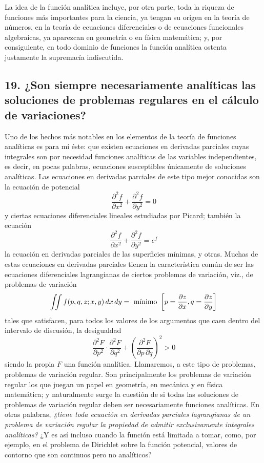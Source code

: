 \documentclass[a4paper, 12pt]{article}
\begin{document}
La idea de la función analítica incluye, por otra parte, toda la riqueza de funciones más importantes para la ciencia, ya tengan su origen en la teoría de números, en la teoría de ecuaciones diferenciales o de ecuaciones funcionales algebraicas, ya aparezcan en geometría o en física matemática; y, por consiguiente, en todo  dominio de funciones la función analítica ostenta justamente la supremacía indiscutida.


{\subsection*{19. ¿Son siempre necesariamente analíticas las soluciones
de problemas regulares en el cálculo de variaciones?}


Uno de los hechos más notables en los elementos de la teoría de funciones analíticas es para mí éste: que existen ecuaciones en derivadas parciales cuyas integrales son por necesidad funciones analíticas de las variables independientes, es decir, en pocas palabras, ecuaciones susceptibles únicamente de soluciones analíticas. Las ecuaciones en derivadas parciales de este tipo mejor conocidas son la ecuación de potencial
$$
\frac{\partial^2 f}{\partial x^2}+ \frac{\partial^2 f}{\partial y^2}=0
$$
y ciertas ecuaciones diferenciales lineales estudiadas por Picard; también la ecuación
$$
\frac{\partial^2 f}{\partial x^2}+ \frac{\partial^2 f}{\partial y^2}=e^f
$$
la ecuación en derivadas parciales de las superficies mínimas, y otras. Muchas de estas ecuaciones en derivadas parciales tienen la característica común de ser las ecuaciones diferenciales lagrangianas de ciertos problemas de variación, viz., de problemas de variación
$$
\iint f(p,q,z;x,y) \, dx \, dy = \text{ mínimo }\\
\left[
p=\frac{\partial z}{\partial x}, q = \frac{\partial z}{\partial y} \right]
$$
tales que satisfacen, para todos los valores de los argumentos que caen dentro del intervalo de discusión, la desigualdad
$$
\frac{\partial^2 F}{\partial p^2} \cdot \frac{\partial^2 F}{\partial q^2} + \left(\frac{\partial^2 F}{\partial p \, \partial q}\right)^2 >0
$$
siendo la propia $F$ una función analítica. Llamaremos, a este tipo de problemas, problemas de variación regular. Son principalmente los problemas de variación regular los que juegan un papel en geometría, en mecánica y en física matemática; y naturalmente surge la cuestión de si todas las soluciones de problemas de variación regular deben ser necesariamente funciones analíticas. En otras palabras, \textit{¿tiene toda ecuación en derivadas parciales lagrangianas de un problema de variación regular la propiedad de admitir exclusivamente integrales analíticas?} ¿Y es así incluso cuando la función está limitada a tomar, como, por ejemplo, en el problema de Dirichlet sobre la función potencial, valores de contorno que son continuos pero no analíticos?

}
\end{document}
